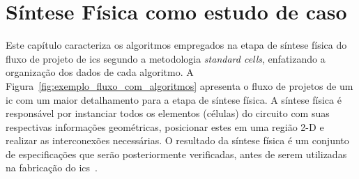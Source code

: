 \chapter{Síntese Física como estudo de caso}
\label{cap:caracterizacaoSinteseFisica}




Este capítulo caracteriza os algoritmos empregados na etapa de síntese física do fluxo de projeto de \acp{ic} segundo a metodologia \textit{standard cells}, enfatizando a organização dos dados de cada algoritmo.
A Figura~\ref{fig:exemplo_fluxo_com_algoritmos} apresenta o fluxo de projetos de um \ac{ic} com um maior detalhamento para a etapa de síntese física. 
A síntese física é responsável por instanciar todos os elementos (células) do circuito com suas respectivas informações geométricas, posicionar estes em uma região 2-D e realizar as interconexões necessárias. O resultado da síntese física é um conjunto de especificações que serão posteriormente verificadas, antes de serem utilizadas na fabricação do \acp{ic}~\cite{kahng2011vlsi}.

